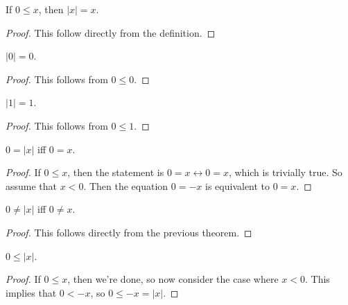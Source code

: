 \documentclass[../math.tex]{subfiles}
\begin{document}
\begin{theorem} \label{abs-pos-eq}
    If $0 \leq x$, then $|x| = x$.
\end{theorem}
\begin{proof}
    This follow directly from the definition.
\end{proof}

\begin{theorem}
    $|0| = 0$.
\end{theorem}
\begin{proof}
    This follows from $0 \leq 0$.
\end{proof}

\begin{theorem}
    $|1| = 1$.
\end{theorem}
\begin{proof}
    This follows from $0 \leq 1$.
\end{proof}

\begin{theorem}
    $0 = |x|$ iff $0 = x$.
\end{theorem}
\begin{proof}
    If $0 \leq x$, then the statement is $0 = x \leftrightarrow 0 = x$, which is
    trivially true.  So assume that $x < 0$.  Then the equation $0 = -x$ is
    equivalent to $0 = x$.
\end{proof}

\begin{theorem}
    $0 \neq |x|$ iff $0 \neq x$.
\end{theorem}
\begin{proof}
    This follows directly from the previous theorem.
\end{proof}

\begin{theorem}
    $0 \leq |x|$.
\end{theorem}
\begin{proof}
    If $0 \leq x$, then we're done, so now consider the case where $x < 0$.
    This implies that $0 < -x$, so $0 \leq -x = |x|$.
\end{proof}
\end{document}
